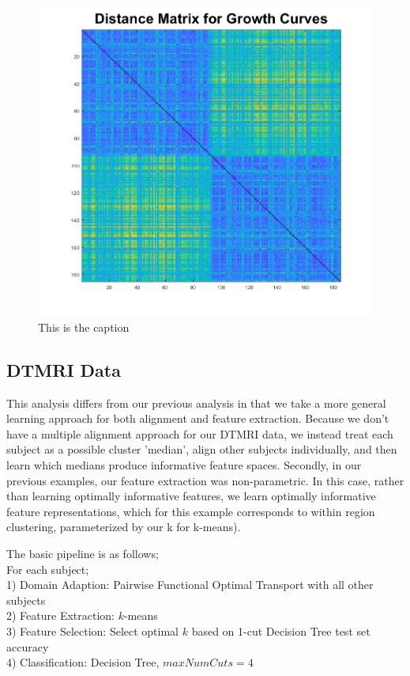 \documentclass[]{article}
\begin{document}
\begin{figure}
	\begin{center}	
	\includegraphics[width = .5\linewidth]{./Distance Matrix.png}
	\caption{This is the caption}
	\label{distance matrix}		
	\end{center}
\end{figure}

\subsection{DTMRI Data}\label{DTMRI}

This analysis differs from our previous analysis in that we take a more general learning approach for both alignment and feature extraction. Because we don't have a multiple alignment approach for our DTMRI data, we instead treat each subject as a possible cluster 'median', align other subjects individually, and then learn which medians produce informative feature spaces. Secondly, in our previous examples, our feature extraction was non-parametric. In this case, rather than learning optimally informative features, we learn optimally informative feature representations, which for this example corresponds to within region clustering, parameterized by our k for k-means).

The basic pipeline is as follows;\\

\noindent
For each subject;\\
1) Domain Adaption: Pairwise Functional Optimal Transport with all other subjects\\
2) Feature Extraction: $k$-means\\
3) Feature Selection: Select optimal $k$ based on 1-cut Decision Tree test set accuracy\\
4) Classification: Decision Tree, $maxNumCuts = 4$\\
\end{document}
